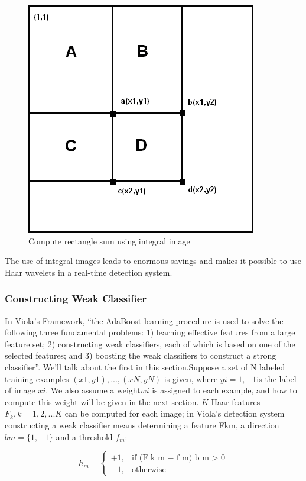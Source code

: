\documentclass[12pt, twoside]{report}
\begin{document}
\begin{figure}
	\centering
	\includegraphics{img/13_1.png}
	\caption{Compute rectangle sum using integral image}
\end{figure}

\par
The use of integral images leads to enormous savings and makes it possible to use Haar
wavelets in a real-time detection system.
\subsubsection{Constructing Weak Classifier}

\par
In Viola’s Framework, ``the AdaBoost learning procedure is used to solve the following
three fundamental problems: 1) learning effective features from a large feature set; 2)
constructing weak classifiers, each of which is based on one of the selected features; and
3) boosting the weak classifiers to construct a strong classifier''. We’ll talk about the
first in this section.Suppose a set of N labeled training examples $(x1, y1), . . . ,(xN , yN )$ is given, where
$yi = {1, −1} $is the label of image $xi$. We also assume a weight$ wi$ is assigned to each example, and how to compute this weight will be given in the next section. $K$ Haar features $F_k, k = 1, 2, . . . K$ can be computed for each image; in Viola’s detection system constructing a weak classifier means determining a feature Fkm, a direction $bm = \{1, −1\}$ and a threshold $f_m$:
\begin{center}
	\begin{equation}
		h_m = \begin{cases}
			+1, & \text{if (F_{k_m} − f_m) b_m > 0} \\
			-1, & \text{otherwise}
		\end{cases}
	\end{equation}	
\end{center}
\end{document}

